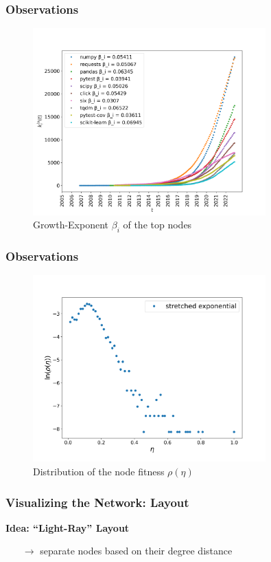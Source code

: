\documentclass[fleqn]{beamer}
\begin{document}
    \begin{frame}
        \frametitle{Observations}
        \begin{figure}[htpb]
            \centering
            \includegraphics[width=0.8\textwidth]{./pics/edge_growth.png}
            \caption{Growth-Exponent $\beta_i$ of the top nodes}
        \end{figure}
    \end{frame}

    \begin{frame}
        \frametitle{Observations}
        \begin{figure}[htpb]
            \centering
            \includegraphics[width=0.8\textwidth]{./pics/fitness.png}
            \caption{Distribution of the node fitness $\rho(\eta)$}
        \end{figure}
    \end{frame}

    \begin{frame}
        \frametitle{Visualizing the Network: Layout}
        \centering \textbf{Idea: ``Light-Ray'' Layout}
        \begin{itemize}
            \item[$\to$] separate nodes based on their degree
                distance
        \end{itemize}
    \end{frame}
\end{document}
